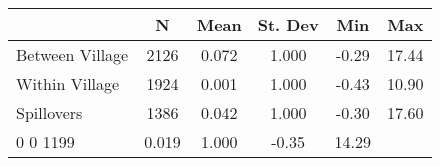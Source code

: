 \begin{tabular}{l*{5}{c}}\hline&\multicolumn{1}{c}{N}&\multicolumn{1}{c}{Mean}&\multicolumn{1}{c}{St. Dev}&\multicolumn{1}{c}{Min}&\multicolumn{1}{c}{Max}\\ \hline 
Between Village & 2126 & 0.072 & 1.000 & -0.29 & 17.44 \\
Within Village & 1924 & 0.001 & 1.000 & -0.43 & 10.90 \\
Spillovers & 1386 & 0.042 & 1.000 & -0.30 & 17.60 \\
0 0 1199 & 0.019 & 1.000 & -0.35 & 14.29 \\
\hline \end{tabular}
